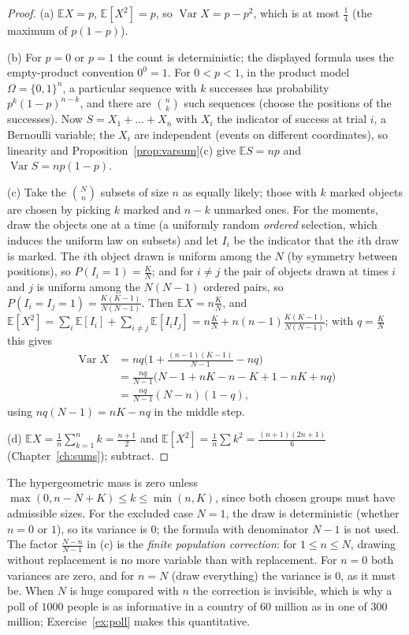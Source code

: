 \begin{proof}
(a) $\mathbb EX=p$, $\mathbb E[X^2]=p$, so $\operatorname{Var}X=p-p^2$, which is at most $\frac14$ (the maximum of $p(1-p)$).

(b) For $p=0$ or $p=1$ the count is deterministic; the displayed formula uses the empty-product convention $0^0=1$. For $0<p<1$, in the product model $\Omega=\{0,1\}^n$, a particular sequence with $k$ successes has probability $p^k(1-p)^{n-k}$, and there are $\binom nk$ such sequences (choose the positions of the successes). Now $S=X_1+\dots+X_n$ with $X_i$ the indicator of success at trial $i$, a Bernoulli variable; the $X_i$ are independent (events on different coordinates), so linearity and Proposition~\ref{prop:varsum}(c) give $\mathbb ES=np$ and $\operatorname{Var}S=np(1-p)$.

(c) Take the $\binom Nn$ subsets of size $n$ as equally likely; those with $k$ marked objects are chosen by picking $k$ marked and $n-k$ unmarked ones. For the moments, draw the objects one at a time (a uniformly random \emph{ordered} selection, which induces the uniform law on subsets) and let $I_i$ be the indicator that the $i$th draw is marked. The $i$th object drawn is uniform among the $N$ (by symmetry between positions), so $P(I_i=1)=\frac KN$; and for $i\ne j$ the pair of objects drawn at times $i$ and $j$ is uniform among the $N(N-1)$ ordered pairs, so $P(I_i=I_j=1)=\frac{K(K-1)}{N(N-1)}$. Then $\mathbb EX=n\frac KN$, and $\mathbb E[X^2]=\sum_i\mathbb E[I_i]+\sum_{i\ne j}\mathbb E[I_iI_j]=n\frac KN+n(n-1)\frac{K(K-1)}{N(N-1)}$; with $q=\frac KN$ this gives
\[
\begin{aligned}\operatorname{Var}X&=nq\Big(1+\frac{(n-1)(K-1)}{N-1}-nq\Big)\\&=\frac{nq}{N-1}\big(N-1+nK-n-K+1-nK+nq\big)\\&=\frac{nq}{N-1}(N-n)(1-q),\end{aligned}
\]
using $nq(N-1)=nK-nq$ in the middle step.

(d) $\mathbb EX=\frac1n\sum_{k=1}^nk=\frac{n+1}2$ and $\mathbb E[X^2]=\frac1n\sum k^2=\frac{(n+1)(2n+1)}6$ (Chapter~\ref{ch:sums}); subtract.
\end{proof}

The hypergeometric mass is zero unless $\max(0,n-N+K)\le k\le\min(n,K)$, since both chosen groups must have admissible sizes. For the excluded case $N=1$, the draw is deterministic (whether $n=0$ or $1$), so its variance is $0$; the formula with denominator $N-1$ is not used. The factor $\frac{N-n}{N-1}$ in (c) is the \emph{finite population correction}: for $1\le n\le N$, drawing without replacement is no more variable than with replacement. For $n=0$ both variances are zero, and for $n=N$ (draw everything) the variance is $0$, as it must be. When $N$ is huge compared with $n$ the correction is invisible, which is why a poll of $1000$ people is as informative in a country of $60$ million as in one of $300$ million; Exercise~\ref{ex:poll} makes this quantitative.

